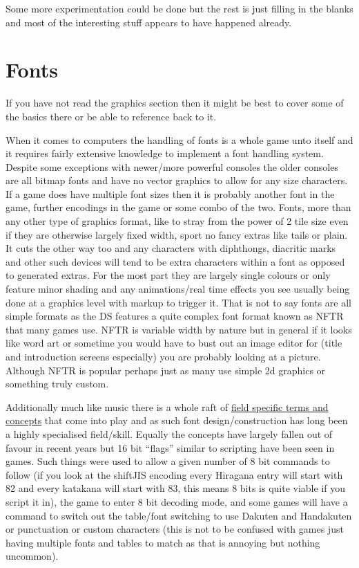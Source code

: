 \documentclass[
]{book}
\begin{document}
Some more experimentation could be done but the rest is just filling in the blanks and most of the interesting stuff appears to have happened already.

\hypertarget{fonts}{%
\section{Fonts}\label{fonts}}

If you have not read the graphics section then it might be best to cover some of the basics there or be able to reference back to it.

When it comes to computers the handling of fonts is a whole game unto itself and it requires fairly extensive knowledge to implement a font handling system. Despite some exceptions with newer/more powerful consoles the older consoles are all bitmap fonts and have no vector graphics to allow for any size characters. If a game does have multiple font sizes then it is probably another font in the game, further encodings in the game or some combo of the two. Fonts, more than any other type of graphics format, like to stray from the power of 2 tile size even if they are otherwise largely fixed width, sport no fancy extras like tails or plain. It cuts the other way too and any characters with diphthongs, diacritic marks and other such devices will tend to be extra characters within a font as opposed to generated extras. For the most part they are largely single colours or only feature minor shading and any animations/real time effects you see usually being done at a graphics level with markup to trigger it. That is not to say fonts are all simple formats as the DS features a quite complex font format known as NFTR that many games use. NFTR is variable width by nature but in general if it looks like word art or sometime you would have to bust out an image editor for (title and introduction screens especially) you are probably looking at a picture. Although NFTR is popular perhaps just as many use simple 2d graphics or something truly custom.

Additionally much like music there is a whole raft of \href{http://www.fontshop.com/glossary/}{field specific terms and concepts} that come into play and as such font design/construction has long been a highly specialised field/skill. Equally the concepts have largely fallen out of favour in recent years but 16 bit ``flags'' similar to scripting have been seen in games. Such things were used to allow a given number of 8 bit commands to follow (if you look at the shiftJIS encoding every Hiragana entry will start with 82 and every katakana will start with 83, this means 8 bits is quite viable if you script it in), the game to enter 8 bit decoding mode, and some games will have a command to switch out the table/font switching to use Dakuten and Handakuten or punctuation or custom characters (this is not to be confused with games just having multiple fonts and tables to match as that is annoying but nothing uncommon).
\end{document}
